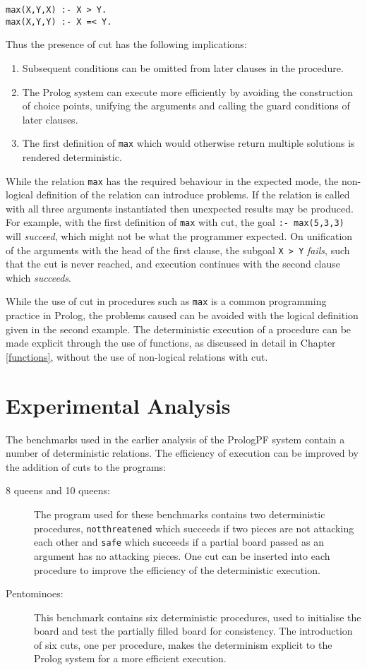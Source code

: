 \begin{verbatim}
max(X,Y,X) :- X > Y.
max(X,Y,Y) :- X =< Y.
\end{verbatim}
Thus the presence of cut has the following implications:
\begin{enumerate}
\item{Subsequent conditions can be omitted from later clauses in the procedure.}
\item{The Prolog system can execute more efficiently by avoiding the construction of
  choice points, unifying the arguments and calling the guard conditions of later clauses.}
\item{The first definition of \texttt{max} which would otherwise return multiple
  solutions is rendered deterministic.}
\end{enumerate}
While the relation \texttt{max} has the required behaviour in the
expected mode, the non-logical definition of the relation can
introduce problems.  If the relation is called with all three
arguments instantiated then unexpected results may be produced.  For
example, with the first definition of \texttt{max} with cut, the goal
\texttt{:- max(5,3,3)} will \textit{succeed}, which might not be what the programmer
expected.  On unification of the
arguments with the head of the first clause, the subgoal \texttt{X >
Y} \textit{fails}, such that the cut is never reached, and execution
continues with the second clause which \textit{succeeds}.

While the use of cut in procedures such as \texttt{max} is a common
programming practice in Prolog, the problems caused can be avoided
with the logical definition given in the second example.  The
deterministic execution of a procedure can be made explicit through
the use of functions, as discussed in detail in Chapter
\ref{functions}, without the use of non-logical relations with cut.

\section{Experimental Analysis} %
\label{cut_exp}

The benchmarks used in the earlier analysis of the PrologPF system contain a number
of deterministic relations.  The efficiency of execution can be improved by the
addition of cuts to the programs:
\begin{description}
\item[8 queens and 10 queens: ]{The program used for these benchmarks contains two
  deterministic procedures, \texttt{notthreatened} which succeeds if two pieces are
  not attacking each other and \texttt{safe} which succeeds if a partial board passed
  as an argument has no attacking pieces.  One cut can be inserted into each procedure
  to improve the efficiency of the deterministic execution.}
\item[Pentominoes: ]{This benchmark contains six deterministic procedures, used to
  initialise the board and test the partially filled board for consistency.  The
  introduction of six cuts, one per procedure, makes the determinism explicit to the
  Prolog system for a more efficient execution.}
\end{description}

